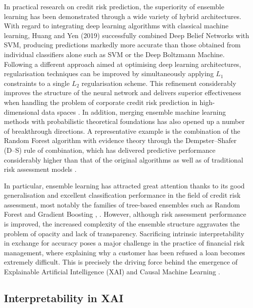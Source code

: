 In practical research on credit risk prediction, the superiority of ensemble learning has been demonstrated through a wide variety of hybrid architectures. With regard to integrating deep learning algorithms with classical machine learning, Huang and Yen (2019) \cite{huang2019performance} successfully combined Deep Belief Networks with SVM, producing predictions markedly more accurate than those obtained from individual classifiers alone such as SVM or the Deep Boltzmann Machine. Following a different approach aimed at optimising deep learning architectures, regularisation techniques can be improved by simultaneously applying $L_1$ constraints to a single $L_2$ regularisation scheme. This refinement considerably improves the structure of the neural network and delivers superior effectiveness when handling the problem of corporate credit risk prediction in high-dimensional data spaces \cite{yang2023deep}. In addition, merging ensemble machine learning methods with probabilistic theoretical foundations has also opened up a number of breakthrough directions. A representative example is the combination of the Random Forest algorithm with evidence theory through the Dempster--Shafer (D--S) rule of combination, which has delivered predictive performance considerably higher than that of the original algorithms as well as of traditional risk assessment models \cite{zhu2022optimization}.

In particular, ensemble learning has attracted great attention thanks to its good generalisation and excellent classification performance in the field of credit risk assessment, most notably the families of tree-based ensembles such as Random Forest and Gradient Boosting \cite{rao2020stage}, \cite{zhou2021credit}. However, although risk assessment performance is improved, the increased complexity of the ensemble structure aggravates the problem of opacity and lack of transparency. Sacrificing intrinsic interpretability in exchange for accuracy poses a major challenge in the practice of financial risk management, where explaining why a customer has been refused a loan becomes extremely difficult. This is precisely the driving force behind the emergence of Explainable Artificial Intelligence (XAI) and Causal Machine Learning \cite{liu2024credit}.

\subsection{Interpretability in XAI}
